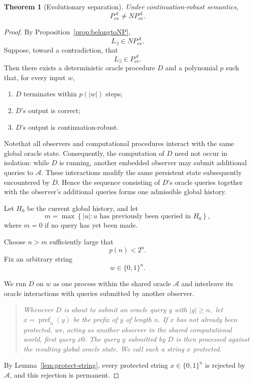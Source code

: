 \documentclass[11pt]{article}
\newtheorem{theorem}[definition]{Theorem}
\begin{document}
\begin{theorem}[Evolutionary separation]
\label{thm:evsep-appendix}
Under continuation-robust semantics,
\[
P_{\mathrm{ev}}^{\mathcal A}
\neq
NP_{\mathrm{ev}}^{\mathcal A}.
\]
\end{theorem}

\begin{proof}
By Proposition~\ref{prop:belongtoNP},
\[
L_{\exists}\in NP_{\mathrm{ev}}^{\mathcal A}.
\]
Suppose, toward a contradiction, that
\[
L_{\exists}\in P_{\mathrm{ev}}^{\mathcal A}.
\]
Then there exists a deterministic oracle procedure \(D\) and a
polynomial \(p\) such that, for every input \(w\),

\begin{enumerate}[label=(\roman*)]
    \item \(D\) terminates within \(p(|w|)\) steps;
    \item \(D\)'s output is correct;
    \item \(D\)'s output is continuation-robust.
\end{enumerate}

Notethat all observers and computational procedures interact with the same global oracle state. Consequently, the computation of \(D\) need not occur in isolation: while \(D\) is running, another embedded observer may submit additional queries to \(\mathcal A\). These interactions modify the same persistent state subsequently encountered by \(D\). Hence the sequence consisting of \(D\)'s oracle queries together with the observer's additional queries forms one admissible global history.

\vspace{0.1cm}

Let \(H_0\) be the current global history, and let
\[
m
=
\max
\left\{
|u| :
u \text{ has previously been queried in }H_0
\right\},
\]
where \(m=0\) if no query has yet been made.

Choose \(n>m\) sufficiently large that
\[
p(n)<2^n.
\]
Fix an arbitrary string
\[
w\in\{0,1\}^n.
\]

We run \(D\) on \(w\) as one process within the   shared oracle \(\mathcal A\) and interleave its oracle interactions with queries submitted by another observer.

 

\begin{quote}
\textit{Whenever \(D\) is about to submit an oracle query \(y\) with
\(|y|\ge n,\)
let
\(x=\operatorname{pref}_n(y)\)
be the prefix of \(y\) of length \(n\). If \(x\) has not already been
protected, we, acting as another observer in the shared computational world,
first query \(x0\). The query \(y\) submitted by \(D\) is then processed
against the resulting global oracle state. We call such a string \(x\)
\emph{protected}.}
\end{quote}
By Lemma~\ref{lem:protect-string}, every protected string
\(x\in\{0,1\}^n\) is rejected by \(\mathcal A\), and this rejection is
permanent.


\end{proof}
\end{document}
